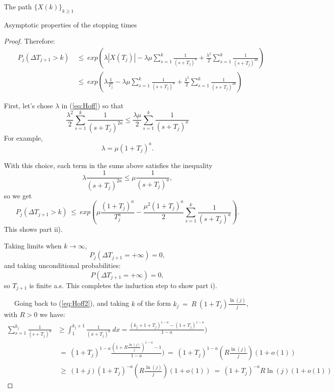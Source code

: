 \documentclass[12pt]{article}
\begin{document}
\begin{section}{The path $\{X(k)\}_{k\ge1}$ }
\begin{subsection}{Asymptotic properties of the stopping times}
\begin{proof}
Therefore:
\begin{align} \label{eq:Hoff}
&& P_j\left( \Delta T_{j+1} > k \right) &~\le~
exp\left( 
\lambda |X(T_{j})| 
-\lambda \mu \sum_{s=1}^{k} \frac{1}{{(s+T_j)}^a}  +
 \frac{\lambda^2}{2} \sum_{s=1}^{k}\frac{1}{{(s+T_j)}^{2a} }  \right) \nonumber \\
&& &~\le~
 exp\left( 
 \lambda \frac{1}{T_j^a} 
 -\lambda \mu \sum_{s=1}^{k} \frac{1}{{(s+T_j)}^a}  +
 \frac{\lambda^2}{2} \sum_{s=1}^{k}\frac{1}{{(s+T_j)}^{2a} }  \right)
\end{align}

First, let's chose $\lambda$ in (\ref{eq:Hoff}) so that 
$$
\frac{\lambda^2}{2} \sum_{s=1}^{k}\frac{1}{{(s+T_j)}^{2a} } \le 
\frac{\lambda \mu}{2} \sum_{s=1}^{k} \frac{1}{{(s+T_j)}^a}  
$$
For example, 
\begin{equation}
\lambda = \mu (1+T_j)^a .
\end{equation}


With this choice, each term in the sums above satisfies the inequality
$$
\lambda \frac{1}{{(s+T_j)}^{2a} } \le \mu \frac{1}{{(s+T_j)}^a}  ,
$$
so we get
\begin{equation} \label{eq:Hoff2}
 P_j\left( \Delta T_{j+1} > k \right) ~\le~
exp\left( 
\mu  \frac{(1+T_j)^a}{T_j^a} 
- \frac{\mu^2 (1+T_j)^a}{2} \sum_{s=1}^{k} \frac{1}{{(s+T_j)}^a}  \right).
\end{equation} This shows part ii).  

Taking limits when $k \rightarrow \infty$,
\begin{equation} 
P_j( \Delta T_{j+1} =+\infty ) = 0,
\end{equation}
and taking unconditional probabilities:
\begin{equation} 
P( \Delta T_{j+1} =+\infty ) = 0,
\end{equation} 
so $T_{j+1}$ is finite a.s. This completes the induction step to show part i).


\   
\   
\   
Going back to (\ref{eq:Hoff2}), and taking $k$ of the form $k_j ~=~ R \ (1+T_j) \frac{\ln(j)}{j}$, with $R>0$ we have:
\begin{align*}
\sum_{s=1}^{k_j} \frac{1}{{(s+T_j)}^a} &\ge \int_{1}^{k_j+1} \frac{1}{{(x+T_j)}^a} \ dx = \frac{(k_j+1+T_j)^{1-a} - (1+T_j)^{1-a}}{1-a}) \\
&~=~ (1+T_j)^{1-a} \frac{( 1 + R \frac{\ln(j)}{j})^{1-a} - 1}{1-a})  ~=~
(1+T_j)^{1-a} ( R \frac{\ln(j)}{j}) (1+ o(1)) \\
&~\ge~  (1+j)(1+T_j)^{-a} ( R \frac{\ln(j)}{j}) (1+ o(1)) ~=~ 
 (1+T_j)^{-a} R \ln(j) (1+ o(1))
\end{align*}


\end{proof}
\end{subsection}
\end{section}
\end{document}

